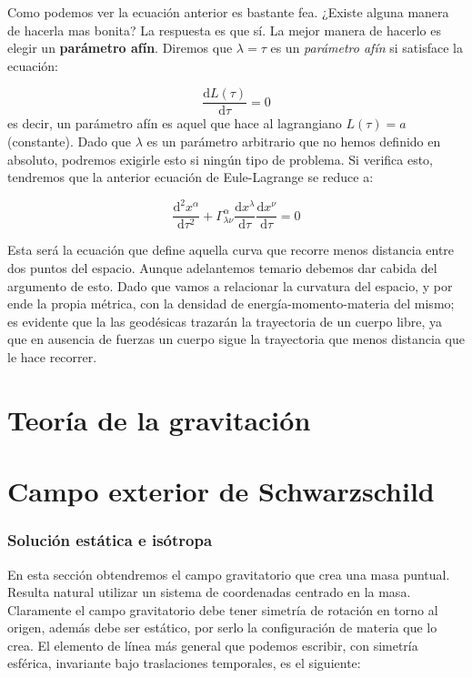 \documentclass[12pt,a4paper]{book}
\numberwithin{equation}{section}
\numberwithin{figure}{section}
\newcommand{\D}{\mathrm{d}}
\newcommand{\derivadas}[2]{\frac{\D #1}{\D #2}}
\begin{document}
Como podemos ver la ecuación anterior es bastante fea. ¿Existe alguna manera de hacerla mas bonita? La respuesta es que sí. La mejor manera de hacerlo es elegir un \textbf{parámetro afín}. Diremos que $\lambda = \tau$ es un \textit{parámetro afín} si satisface la ecuación:

\begin{equation}
\derivadas{L(\tau)}{\tau} = 0
\end{equation}
es decir, un parámetro afín es aquel que hace al lagrangiano $L(\tau)=a$ (constante). Dado que $\lambda$ es un parámetro arbitrario que no hemos definido en absoluto, podremos exigirle esto si ningún tipo de problema. Si verifica esto, tendremos que la anterior ecuación de Eule-Lagrange se reduce a:

\begin{equation}
\derivadas{^2x^\alpha}{\tau^2} + \Gamma^\alpha_{\lambda \nu} \derivadas{x^\lambda}{\tau	} \derivadas{x^\nu}{\tau} = 0
\end{equation}

Esta será la ecuación que define aquella curva que recorre menos distancia entre dos puntos del espacio. Aunque adelantemos temario debemos dar cabida del argumento de esto. Dado que vamos a relacionar la curvatura del espacio, y por ende la propia métrica, con la densidad de energía-momento-materia del mismo; es evidente que la las geodésicas trazarán la trayectoria de un cuerpo libre, ya que en ausencia de fuerzas un cuerpo sigue la trayectoria que menos distancia que le hace recorrer. 

 \newpage

\chapter{Teoría de la gravitación}

\newpage

\chapter{Campo exterior de Schwarzschild}

\subsection{Solución estática e isótropa}


En esta sección obtendremos el campo gravitatorio que crea una masa puntual. Resulta natural utilizar un sistema de coordenadas centrado en la masa. Claramente el campo gravitatorio debe tener simetría de rotación en torno al origen, además debe ser estático, por serlo la configuración de materia que lo crea. El elemento de línea más general que podemos escribir, con simetría esférica, invariante bajo traslaciones temporales, es el siguiente:
\end{document}
